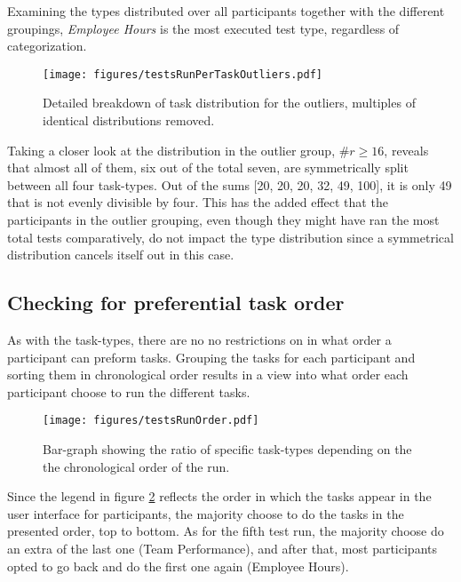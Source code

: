     Examining the types distributed over all participants together
    with the different groupings, \textit{Employee Hours} is the most
    executed test type, regardless of categorization.

    \begin{figure}[h!]
      \centering
      \texttt{[image: figures/testsRunPerTaskOutliers.pdf]}
      \caption{
        Detailed breakdown of task distribution for the outliers, multiples
        of identical distributions removed.
      }
      \label{label_testsRunPerTaskOutliers}
    \end{figure}

    Taking a closer look at the distribution in the outlier group,
    $\#r\geq16$, reveals that almost all of them, six out of the total seven,
    are symmetrically split between all four task-types. Out of the sums
    [20, 20, 20, 32, 49, 100], it is only 49 that is not evenly divisible
    by four. This has the added effect that the participants in the
    outlier grouping, even though they might have ran the most total tests
    comparatively, do not impact the type distribution since a symmetrical
    distribution cancels itself out in this case.


  \subsection{Checking for preferential task order}


    As with the task-types, there are no no restrictions on in what order a
    participant can preform tasks. Grouping the tasks for each participant
    and sorting them in chronological order results in a view into what
    order each participant choose to run the different tasks.

    \begin{figure}[ht!]
      \centering
      \texttt{[image: figures/testsRunOrder.pdf]}
      \caption{
        Bar-graph showing the ratio of specific task-types depending on the
        the chronological order of the run.
      }
      \label{label_testsRunOrder}
    \end{figure}

    Since the legend in figure \ref{label_testsRunOrder} reflects the order
    in which the tasks appear in the user interface for participants, the
    majority choose to do the tasks in the presented order, top to bottom.
    As for the fifth test run, the majority choose do an extra of the last
    one (Team Performance), and after that, most participants opted to go
    back and do the first one again (Employee Hours).

